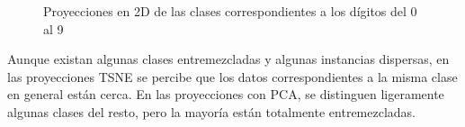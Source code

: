 \documentclass[a4]{article}
\begin{document}
\begin{figure}[H]
  \centering
  \caption{Proyecciones en 2D de las clases correspondientes a los dígitos del 0 al 9}
  \label{fig:digit0-9}
\end{figure}

Aunque existan algunas clases entremezcladas y algunas instancias
dispersas, en las proyecciones TSNE se percibe que los datos
correspondientes a la misma clase en general están cerca. En las
proyecciones con PCA, se distinguen ligeramente algunas clases del
resto, pero la mayoría están totalmente entremezcladas.
\end{document}
